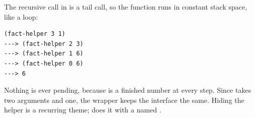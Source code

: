 The recursive call in  is a tail call, so the function runs in constant stack space, like a loop:
\begin{lstlisting}[style=repl]
(fact-helper 3 1)
---> (fact-helper 2 3)
---> (fact-helper 1 6)
---> (fact-helper 0 6)
---> 6
\end{lstlisting}
Nothing is ever pending, because  is a finished number at every step. Since  takes two arguments and  one, the wrapper  keeps the interface the same. Hiding the helper is a recurring theme;  does it with a named .
